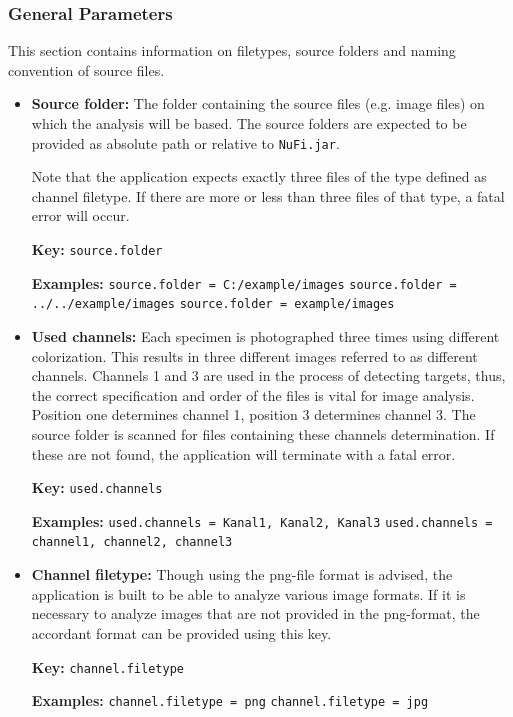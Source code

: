 \documentclass[a4paper, 12pt, twoside]{article}
\newcommand{\code}[1]{\colorbox{codegray}{\texttt{#1}}}
\begin{document}
\subsubsection{General Parameters}
This section contains information on filetypes, source folders and naming
convention of source files.
\begin{itemize}
  \item \textbf{Source folder:} The folder containing the source files (e.g.
  image files) on which the analysis will be based. The source folders are
  expected to be provided as absolute path or relative to \code{NuFi.jar}.
  
  Note that the application expects exactly three files of the type defined as
  channel filetype. If there are more or less than three files of that type, a
  fatal error will occur.
  
  \textbf{Key:}
  \newline \code{source.folder}
  
  \textbf{Examples:}
  \newline \code{source.folder = C:/example/images}
  \newline \code{source.folder = ../../example/images}
  \newline \code{source.folder = example/images}
  
  \item \textbf{Used channels:} Each specimen is photographed three times
  using different colorization. This results in three different images
  referred to as different channels. Channels 1 and 3 are used in the process
  of detecting targets, thus, the correct specification and order of the
  files is vital for image analysis. Position one determines channel 1,
  position 3 determines channel 3. The source folder is scanned for files
  containing these channels determination. If these are not found, the
  application will terminate with a fatal error.
  
  \textbf{Key:}
  \newline \code{used.channels}
  
  \textbf{Examples:}
  \newline \code{used.channels = Kanal1, Kanal2, Kanal3}
  \newline \code{used.channels = channel1, channel2, channel3}
  
  \item \textbf{Channel filetype:} Though using the png-file format is advised,
  the application is built to be able to analyze various image formats. If it
  is necessary to analyze images that are not provided in the png-format, the
  accordant format can be provided using this key.
  
  \textbf{Key:}
  \newline \code{channel.filetype}
  
  \textbf{Examples:}
  \newline \code{channel.filetype = png}
  \newline \code{channel.filetype = jpg}
\end{itemize}
\end{document}
